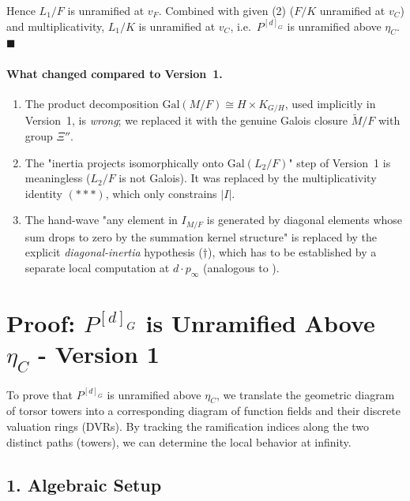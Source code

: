 Hence $L_1/F$ is unramified at $v_F$. Combined with given (2) ($F/K$ unramified at $v_C$) and multiplicativity, $L_1/K$ is unramified at $v_C$, i.e.\ $P^{[d]_G}$ is unramified above $\eta_C$. \hfill $\blacksquare$

\paragraph{What changed compared to Version~1.}
\begin{enumerate}
    \item The product decomposition $\mathrm{Gal}(M/F) \cong H \times K_{G/H}$, used implicitly in Version~1, is \emph{wrong}; we replaced it with the genuine Galois closure $\tilde M/F$ with group $\Xi''$.
    \item The "inertia projects isomorphically onto $\mathrm{Gal}(L_2/F)$" step of Version~1 is meaningless ($L_2/F$ is not Galois). It was replaced by the multiplicativity identity $(\ast{\ast}\ast)$, which only constrains $|I|$.
    \item The hand-wave "any element in $I_{M/F}$ is generated by diagonal elements whose sum drops to zero by the summation kernel structure" is replaced by the explicit \emph{diagonal-inertia} hypothesis ($\dagger$), which has to be established by a separate local computation at $d\cdot p_\infty$ (analogous to ).
\end{enumerate}
\endgroup

\section*{Proof: $P^{[d]_G}$ is Unramified Above $\eta_C$ - Version 1}

To prove that $P^{[d]_G}$ is unramified above $\eta_C$, we translate the geometric diagram of torsor towers into a corresponding diagram of function fields and their discrete valuation rings (DVRs). By tracking the ramification indices along the two distinct paths (towers), we can determine the local behavior at infinity.

\subsection*{1. Algebraic Setup}

